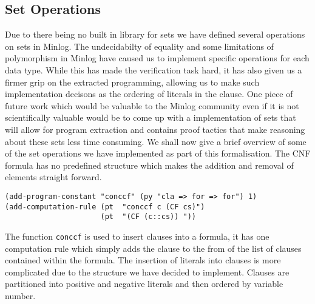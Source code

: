 \subsection*{Set Operations}
Due to there being no built in library for sets we have defined several operations on sets in Minlog. The  undecidabilty of equality and some limitations of polymorphism in Minlog have caused us to implement specific operations for each data type. While this has made the verification task hard, it has also given us a firmer grip on the extracted programming, allowing us to make such implementation decisons as the ordering of literals in the clause. One piece of future work which would be valuable to the Minlog community even if it is not scientifically valuable would be to come up with a implementation of sets that will allow for program extraction and contains proof tactics that make reasoning about these sets less time consuming. We shall now give a brief overview of some of the set operations we have implemented as part of this formalisation. The CNF formula has no predefined structure which makes the addition and removal of elements straight forward.

\begin{lstlisting}[caption = "Code for the addition and removal of clauses from formulae"]
(add-program-constant "conccf" (py "cla => for => for") 1)
(add-computation-rule (pt  "conccf c (CF cs)")
                      (pt  "(CF (c::cs)) "))
\end{lstlisting}

The function \texttt{conccf} is used to insert clauses into a formula, it has one computation rule which simply adds the clause to the from of the list of clauses contained within the formula. The insertion of literals into clauses is more complicated due to the structure we have decided to implement. Clauses are partitioned into positive and negative literals and then ordered by variable number.


